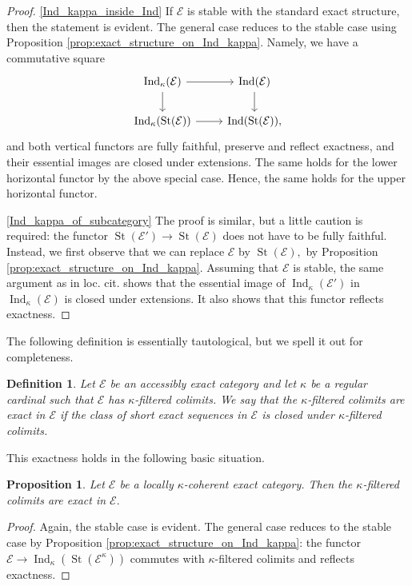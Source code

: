 \documentclass[11pt,leqno]{amsart}
\newtheorem{defi}[theo]{Definition}
\newtheorem{prop}[theo]{Proposition}
\numberwithin{equation}{section}
\newcommand{\St}{\operatorname{St}}
\newcommand{\cE}{{\mathcal E}}
\newcommand{\Ind}{\operatorname{Ind}}
\begin{document}
\begin{proof}
\ref{Ind_kappa_inside_Ind} If $\cE$ is stable with the standard exact structure, then the statement is evident. The general case reduces to the stable case using Proposition \ref{prop:exact_structure_on_Ind_kappa}. Namely, we have a commutative square
\begin{equation*}
\begin{tikzcd}
\Ind_{\kappa}(\cE) \ar[r]\ar[d] & \Ind(\cE)\ar[d]\\
\Ind_{\kappa}(\St(\cE))\ar[r] & \Ind(\St(\cE)),
\end{tikzcd}
\end{equation*}
and both vertical functors are fully faithful, preserve and reflect exactness, and their essential images are closed under extensions. The same holds for the lower horizontal functor by the above special case. Hence, the same holds for the upper horizontal functor.

\ref{Ind_kappa_of_subcategory} The proof is similar, but a little caution is required: the functor $\St(\cE')\to \St(\cE)$ does not have to be fully faithful. Instead, we first observe that we can replace $\cE$ by $\St(\cE),$ by Proposition \ref{prop:exact_structure_on_Ind_kappa}. Assuming that $\cE$ is stable, the same argument as in loc. cit. shows that the essential image of $\Ind_{\kappa}(\cE')$ in $\Ind_{\kappa}(\cE)$ is closed under extensions. It also shows that this functor reflects exactness.
\end{proof}

The following definition is essentially tautological, but we spell it out for completeness.

\begin{defi}
Let $\cE$ be an accessibly exact category and let $\kappa$ be a regular cardinal such that $\cE$ has $\kappa$-filtered colimits. We say that the $\kappa$-filtered colimits are exact in $\cE$ if the class of short exact sequences in $\cE$ is closed under $\kappa$-filtered colimits. 
\end{defi}

This exactness holds in the following basic situation.

\begin{prop}\label{prop:locally_kappa_coherent_satisfies_exactness_of_kappa_filtered}
Let $\cE$ be a locally $\kappa$-coherent exact category. Then the $\kappa$-filtered colimits are exact in $\cE.$
\end{prop}

\begin{proof}
Again, the stable case is evident. The general case reduces to the stable case by Proposition \ref{prop:exact_structure_on_Ind_kappa}: the functor $\cE\to\Ind_{\kappa}(\St(\cE^{\kappa}))$ commutes with $\kappa$-filtered colimits and reflects exactness.
\end{proof}
\end{document}

